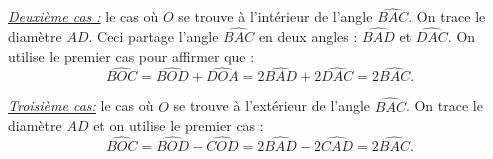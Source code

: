 \begin{preuve}
\underline{\textit{Deuxième cas :}} le cas où $O$ se trouve à l'intérieur de l'angle $\widehat{BAC}$.
\newline
On trace le diamètre $AD$. Ceci partage l'angle $\widehat{BAC}$ en deux angles : $\widehat{BAD}$ et $\widehat{DAC}$. On utilise le premier cas pour affirmer que :
\[
\widehat{BOC}=\widehat{BOD}+\widehat{DOA}=2\widehat{BAD}+2\widehat{DAC}=2\widehat{BAC}.
\]

\underline{\textit{Troisième cas:}} le cas où $O$ se trouve à l'extérieur de l'angle $\widehat{BAC}$.
\newline
On trace le diamètre $AD$ et on utilise le premier cas :
\[
\widehat{BOC}=\widehat{BOD}-\widehat{COD}=2\widehat{BAD}-2\widehat{CAD}=2\widehat{BAC}.
\]

\end{preuve}

